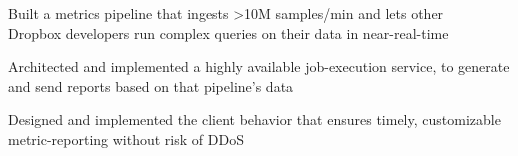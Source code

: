 \documentclass[]{resume}
\begin{document}
\begin{minipage}[t]{0.66\textwidth}
\begin{tightemize}
\item Built a metrics pipeline that ingests >10M samples/min and lets other \\ Dropbox developers run complex queries on their data in near-real-time
\item Architected and implemented a highly available job-execution service, to generate and send reports based on that pipeline's data
\item Designed and implemented the client behavior that ensures timely, customizable metric-reporting without risk of DDoS
\end{tightemize}
\sectionsep

%
%






















\end{minipage}
\end{document}
